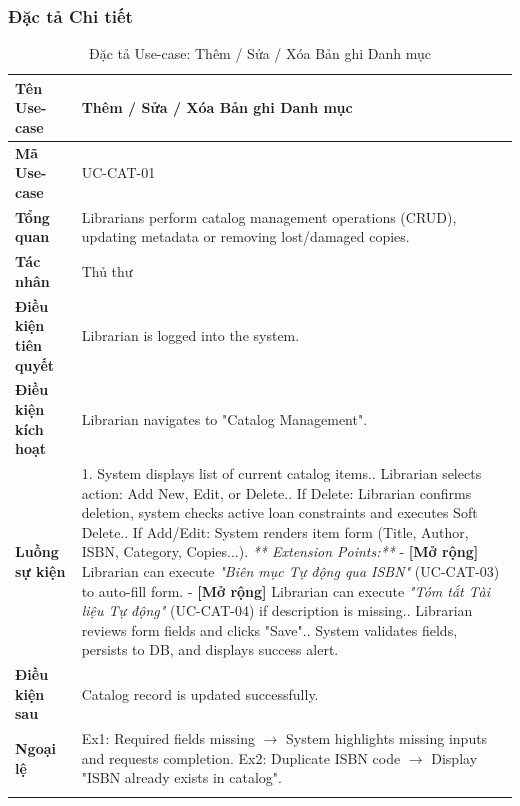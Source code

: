 \subsubsection{Đặc tả Chi tiết}

\begin{longtable}{|p{3.5cm}|p{11.5cm}|}
    \hline
    \textbf{Tên Use-case} & \textbf{Thêm / Sửa / Xóa Bản ghi Danh mục} \\
    \hline
    \textbf{Mã Use-case} & UC-CAT-01 \\
    \hline
    \textbf{Tổng quan} & Librarians perform catalog management operations (CRUD), updating metadata or removing lost/damaged copies. \\
    \hline
    \textbf{Tác nhân} & Thủ thư \\
    \hline
    \textbf{Điều kiện tiên quyết} & Librarian is logged into the system. \\
    \hline
    \textbf{Điều kiện kích hoạt} & Librarian navigates to "Catalog Management". \\
    \hline
    \textbf{Luồng sự kiện} & 
    1. System displays list of current catalog items.\newline
    2. Librarian selects action: Add New, Edit, or Delete.\newline
    3. If Delete: Librarian confirms deletion, system checks active loan constraints and executes Soft Delete.\newline
    4. If Add/Edit: System renders item form (Title, Author, ISBN, Category, Copies...).\newline
    \textit{** Extension Points:**}\newline
    - \textbf{[Mở rộng]} Librarian can execute \textit{"Biên mục Tự động qua ISBN"} (UC-CAT-03) to auto-fill form.\newline
    - \textbf{[Mở rộng]} Librarian can execute \textit{"Tóm tắt Tài liệu Tự động"} (UC-CAT-04) if description is missing.\newline
    5. Librarian reviews form fields and clicks "Save".\newline
    6. System validates fields, persists to DB, and displays success alert. \\
    \hline
    \textbf{Điều kiện sau} & Catalog record is updated successfully. \\
    \hline
    \textbf{Ngoại lệ} & 
    Ex1: Required fields missing $\rightarrow$ System highlights missing inputs and requests completion.\newline
    Ex2: Duplicate ISBN code $\rightarrow$ Display "ISBN already exists in catalog". \\
    \hline
    \caption{Đặc tả Use-case: Thêm / Sửa / Xóa Bản ghi Danh mục}
\end{longtable}

